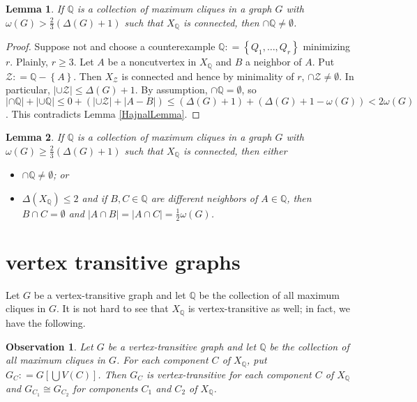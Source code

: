 \documentclass{amsbook}
\theoremstyle{plain}
\newtheorem{lemma}{Lemma}
\newtheorem{observation}{Observation}
\numberwithin{equation}{chapter}
\newcommand{\set}[1]{\left\{ #1 \right\}}
\newcommand{\card}[1]{\left|#1\right|}
\newcommand{\brackets}[1]{\left[ #1 \right]}
\newcommand{\DefinedAs}{\mathrel{\mathop:}=}
\newcommand{\Q}{\mathbb{Q}}
\newcommand{\fancy}[1]{\mathcal{#1}}
\begin{document}
\begin{lemma}\label{KostochkaCliqueGraph}
If $\Q$ is a collection of maximum cliques in a graph $G$ with $\omega(G) > \frac23 (\Delta(G) + 1)$ such that $X_\Q$ is connected, then $\cap \Q \neq \emptyset$. 
\end{lemma}
\begin{proof}
Suppose not and choose a counterexample $\Q \DefinedAs \set{Q_1, \ldots, Q_r}$
minimizing $r$. Plainly, $r \geq 3$. Let $A$ be a noncutvertex in $X_{\Q}$ and
$B$ a neighbor of $A$. Put $\fancy{Z} \DefinedAs \Q - \set{A}$. Then
$X_{\fancy{Z}}$ is connected and hence by minimality of $r$, $\cap \fancy{Z}
\neq \emptyset$. In particular, $\card{\cup \fancy{Z}} \leq \Delta(G) + 1$.
By assumption, $\cap\Q=\emptyset$, so $\card{\cap \Q} + \card{\cup \Q} \leq 0 +
(\card{\cup \fancy{Z}} + \card{A - B}) \leq
(\Delta(G) + 1) + (\Delta(G)+1 - \omega(G)) < 2\omega(G)$. This contradicts
Lemma \ref{HajnalLemma}.
\end{proof}

\begin{lemma}\label{TwoThirdsEqualityStructure}
If $\Q$ is a collection of maximum cliques in a graph $G$ with $\omega(G) \ge \frac23 (\Delta(G) + 1)$ such that $X_\Q$ is connected, then either 
\begin{itemize}
\item $\cap \Q \ne \emptyset$; or
\item $\Delta(X_\Q) \le 2$ and if $B, C \in \Q$ are different neighbors of $A \in \Q$, then $B \cap C = \emptyset$ and $\card{A \cap B} = \card{A \cap C} = \frac12 \omega(G)$.
\end{itemize}
\end{lemma}

\chapter*{vertex transitive graphs}
Let $G$ be a vertex-transitive graph and let $\Q$ be the collection of all
maximum cliques in $G$.  It is not hard to see that $X_\Q$ is vertex-transitive
as well; in fact, we have the following.

\begin{observation}\label{transitiveClustering}
Let $G$ be a vertex-transitive graph and let $\Q$ be the collection of all
maximum cliques in $G$.  For each component $C$ of $X_\Q$, put $G_C \DefinedAs
G\brackets{\bigcup V(C)}$.  Then $G_C$ is vertex-transitive for each component
$C$ of $X_\Q$ and $G_{C_1} \cong G_{C_2}$ for components $C_1$ and $C_2$ of
$X_\Q$.
\end{observation}
\end{document}
